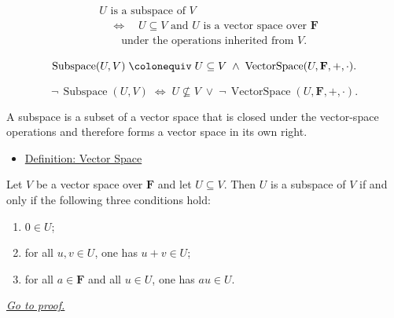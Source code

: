 \begin{remark*}
\[
\begin{aligned}
&U \text{ is a subspace of } V \\
&\quad\Longleftrightarrow\quad
U \subseteq V
\text{ and } U \text{ is a vector space over } \mathbf{F} \\
&\qquad\text{under the operations inherited from } V.
\end{aligned}
\]
\end{remark*}

\begin{remark*}
\[
\operatorname{Subspace}(U,V)
\;\colonequiv\;
U \subseteq V \;\wedge\; \operatorname{VectorSpace}(U,\mathbf{F},+,\cdot).
\]
\end{remark*}

\begin{remark*}
\[
\neg\,\operatorname{Subspace}(U,V)
\;\Longleftrightarrow\;
U \not\subseteq V
\;\vee\;
\neg\,\operatorname{VectorSpace}(U,\mathbf{F},+,\cdot).
\]
\end{remark*}

\begin{remark*}[Interpretation]
A subspace is a subset of a vector space that is closed under the vector-space
operations and therefore forms a vector space in its own right.
\end{remark*}

\begin{remark*}[Dependencies]
\begin{itemize}
  \item \hyperref[def:vector-space]{Definition: Vector Space}
\end{itemize}
\end{remark*}


\begin{tcolorbox}[colback=thmbox, colframe=thmborder, arc=2pt,
  left=6pt, right=6pt, top=4pt, bottom=4pt,
  title={\small\textbf{Theorem (Conditions for a Subspace)}},
  fonttitle=\small\bfseries]
\begin{theorem}
\label{thm:conditions-for-a-subspace}
Let $V$ be a vector space over $\mathbf{F}$ and let $U \subseteq V$.
Then $U$ is a subspace of $V$ if and only if the following three conditions hold:
\begin{enumerate}[label=(\roman*)]
  \item $0 \in U$;
  \item for all $u,v \in U$, one has $u+v \in U$;
  \item for all $a \in \mathbf{F}$ and all $u \in U$, one has $au \in U$.
\end{enumerate}
\hyperref[prf:conditions-for-a-subspace]{\textit{Go to proof.}}
\end{theorem}
\end{tcolorbox}


